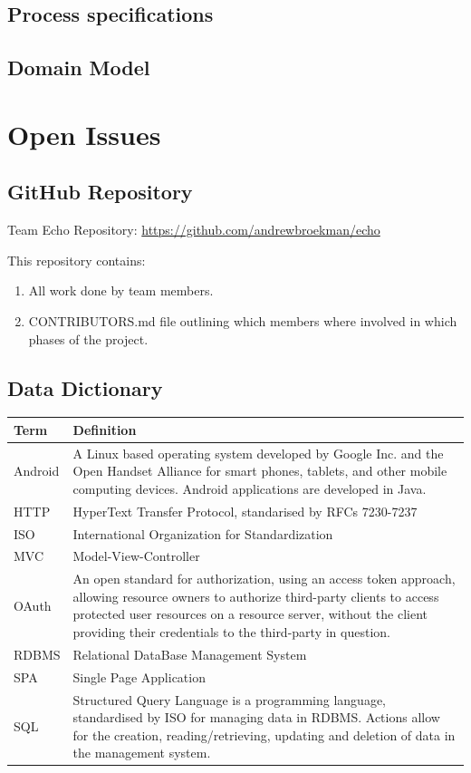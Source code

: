 \documentclass[a4paper,10pt]{article}
\begin{document}
\subsection{Process specifications}

\subsection{Domain Model}

\section{Open Issues}
\subsection {GitHub Repository}
Team Echo Repository: \url{https://github.com/andrewbroekman/echo}

This repository contains:
\begin{enumerate}
\item All work done by team members.
\item CONTRIBUTORS.md file outlining which members where involved in which phases of the project.
\end{enumerate}

\begin{appendices}
\newpage
\section{Data Dictionary}
\begin{tabu} to \textwidth { | X[l] | X[l] | }
	\hline
		\textbf{Term}		& \textbf{Definition}	\\ \hline \hline
		Android			& A Linux based operating system developed by Google Inc. and the Open Handset Alliance for smart phones, tablets, and other mobile computing devices. Android applications are developed in Java. \\ \hline
		HTTP			& HyperText Transfer Protocol, standarised by RFCs 7230-7237 \\ \hline
		ISO				& International Organization for Standardization \\ \hline
		MVC				& Model-View-Controller \\ \hline
		OAuth			& An open standard for authorization, using an access token approach, allowing resource owners to authorize third-party clients to access protected user resources on a resource server, without the client providing their credentials to the third-party in question. \\ \hline
		RDBMS			& Relational DataBase Management System \\ \hline
		SPA				& Single Page Application \\ \hline
		SQL				& Structured Query Language is a programming language, standardised by ISO for managing data in RDBMS. Actions allow for the creation, reading/retrieving, updating and deletion of data in the management system. \\ \hline
	\hline
\end{tabu}

\end{appendices}
\end{document}
